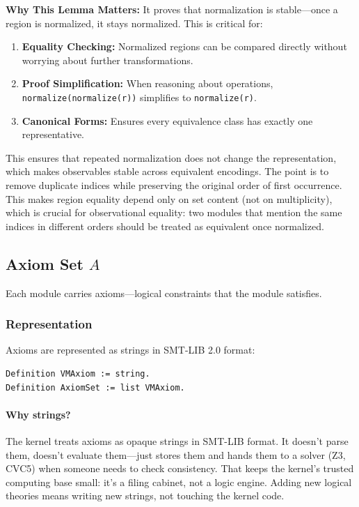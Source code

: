 \textbf{Why This Lemma Matters:} It proves that normalization is stable—once a region is normalized, it stays normalized. This is critical for:
\begin{enumerate}
    \item \textbf{Equality Checking:} Normalized regions can be compared directly without worrying about further transformations.
    \item \textbf{Proof Simplification:} When reasoning about operations, \texttt{normalize(normalize(r))} simplifies to \texttt{normalize(r)}.
    \item \textbf{Canonical Forms:} Ensures every equivalence class has exactly one representative.
\end{enumerate}

This ensures that repeated normalization does not change the representation, which makes observables stable across equivalent encodings.
The point is to remove duplicate indices while preserving the original order of first occurrence. This makes region equality depend only on set content (not on multiplicity), which is crucial for observational equality: two modules that mention the same indices in different orders should be treated as equivalent once normalized.

\subsection{Axiom Set $A$}

Each module carries axioms---logical constraints that the module satisfies.

\subsubsection{Representation}

Axioms are represented as strings in SMT-LIB 2.0 format:
\begin{lstlisting}
Definition VMAxiom := string.
Definition AxiomSet := list VMAxiom.
\end{lstlisting}

\paragraph{Why strings?} The kernel treats axioms as opaque strings in SMT-LIB format. It doesn't parse them, doesn't evaluate them---just stores them and hands them to a solver (Z3, CVC5) when someone needs to check consistency. That keeps the kernel's trusted computing base small: it's a filing cabinet, not a logic engine. Adding new logical theories means writing new strings, not touching the kernel code.

